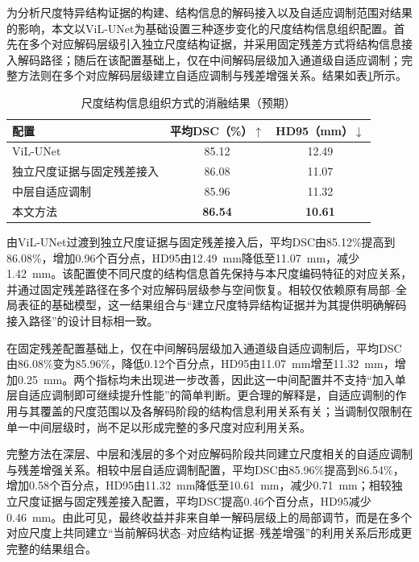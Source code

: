 为分析尺度特异结构证据的构建、结构信息的解码接入以及自适应调制范围对结果的影响，本文以ViL-UNet为基础设置三种逐步变化的尺度结构信息组织配置。首先在多个对应解码层级引入独立尺度结构证据，并采用固定残差方式将结构信息接入解码路径；随后在该配置基础上，仅在中间解码层级加入通道级自适应调制；完整方法则在多个对应解码层级建立自适应调制与残差增强关系。结果如表\ref{tab:ch4-ablation}所示。

\begin{table}[htbp]
  \centering
  \caption{尺度结构信息组织方式的消融结果（预期）}
  \label{tab:ch4-ablation}
  \begin{tabular}{lcc}
    \toprule
    配置 & 平均DSC（\%）$\uparrow$ & HD95（mm）$\downarrow$ \\
    \midrule
    ViL-UNet & 85.12 & 12.49 \\
    独立尺度证据与固定残差接入 & 86.08 & 11.07 \\
    中层自适应调制 & 85.96 & 11.32 \\
    本文方法 & \textbf{86.54} & \textbf{10.61} \\
    \bottomrule
  \end{tabular}
\end{table}

由ViL-UNet过渡到独立尺度证据与固定残差接入后，平均DSC由85.12\%提高到86.08\%，增加0.96个百分点，HD95由12.49~mm降低至11.07~mm，减少1.42~mm。该配置使不同尺度的结构信息首先保持与本尺度编码特征的对应关系，并通过固定残差路径在多个对应解码层级参与空间恢复。相较仅依赖原有局部--全局表征的基础模型，这一结果组合与“建立尺度特异结构证据并为其提供明确解码接入路径”的设计目标相一致。

在固定残差配置基础上，仅在中间解码层级加入通道级自适应调制后，平均DSC由86.08\%变为85.96\%，降低0.12个百分点，HD95由11.07~mm增至11.32~mm，增加0.25~mm。两个指标均未出现进一步改善，因此这一中间配置并不支持“加入单层自适应调制即可继续提升性能”的简单判断。更合理的解释是，自适应调制的作用与其覆盖的尺度范围以及各解码阶段的结构信息利用关系有关；当调制仅限制在单一中间层级时，尚不足以形成完整的多尺度对应利用关系。

完整方法在深层、中层和浅层的多个对应解码阶段共同建立尺度相关的自适应调制与残差增强关系。相较中层自适应调制配置，平均DSC由85.96\%提高到86.54\%，增加0.58个百分点，HD95由11.32~mm降低至10.61~mm，减少0.71~mm；相较独立尺度证据与固定残差接入配置，平均DSC提高0.46个百分点，HD95减少0.46~mm。由此可见，最终收益并非来自单一解码层级上的局部调节，而是在多个对应尺度上共同建立“当前解码状态--对应结构证据--残差增强”的利用关系后形成更完整的结果组合。

